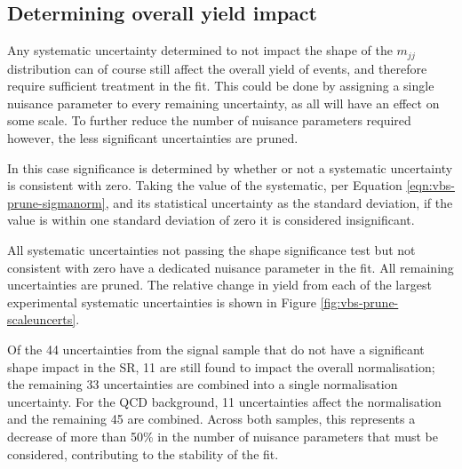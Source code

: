 \subsection{Determining overall yield impact}

Any systematic uncertainty determined to not impact the shape of the $m_{jj}$
distribution can of course still affect the overall yield of events, and
therefore require sufficient treatment in the fit. This could be done by
assigning a single nuisance parameter to every remaining uncertainty, as all
will have an effect on some scale. To further reduce the number of nuisance parameters
required however, the less significant uncertainties are pruned.

In this case significance is determined by whether or not a systematic
uncertainty is consistent with zero. Taking the value of the systematic, per
Equation \ref{eqn:vbs-prune-sigmanorm}, and its statistical uncertainty as the
standard deviation, if the value is within one standard deviation of zero it is
considered insignificant.

All systematic uncertainties not passing the shape significance test but not
consistent with zero have a dedicated nuisance parameter in the fit. All
remaining uncertainties are pruned.
The relative change in yield from each of the largest experimental systematic
uncertainties is shown in Figure \ref{fig:vbs-prune-scaleuncerts}.

Of the 44 uncertainties from the signal sample that do not have a significant
shape impact in the \ac{SR}, 11 are still found to impact the overall
normalisation; the remaining 33 uncertainties are combined into a single
normalisation uncertainty. For the \ac{QCD} \Zy background, 11 uncertainties
affect the normalisation and the remaining 45 are combined. Across both samples,
this represents a decrease of more than 50\% in the number of nuisance
parameters that must be considered, contributing to the stability of the fit.
